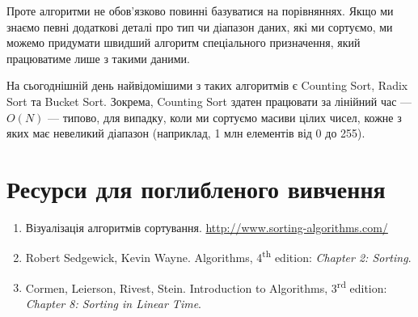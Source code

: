 \documentclass[12pt,a4paper]{report}
\begin{document}
Проте алгоритми не обов’язково повинні базуватися на порівняннях. Якщо ми знаємо певні додаткові деталі про тип чи діапазон даних, які ми сортуємо, ми можемо придумати швидший алгоритм спеціального призначення, який працюватиме лише з такими даними.

На сьогоднішній день найвідомішими з таких алгоритмів є Counting Sort, Radix Sort та Bucket Sort. Зокрема, Counting Sort здатен працювати за лінійний час --- \(O(N)\) --- типово, для випадку, коли ми сортуємо масиви цілих чисел, кожне з яких має невеликий діапазон (наприклад, 1 млн елементів від 0 до 255).



\section*{Ресурси для поглибленого вивчення}
\begin{enumerate}
    \item Візуалізація алгоритмів сортування. \href{http://www.sorting-algorithms.com/}{http://www.sorting-algorithms.com/}
    \item Robert Sedgewick, Kevin Wayne. Algorithms, 4\textsuperscript{th} edition: {\itshape Chapter 2: Sorting}.
    \item Cormen, Leierson, Rivest, Stein. Introduction to Algorithms, 3\textsuperscript{rd} edition: {\itshape Chapter 8: Sorting in Linear Time}.
\end{enumerate}
\end{document}
